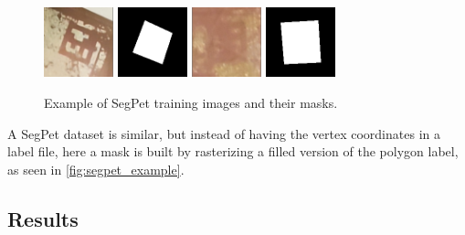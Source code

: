 \documentclass[10pt]{book}
\newcommand{\figureref}[1]{\autoref{#1}}
\begin{document}

\begin{figure}
  \centering
     {\includegraphics[width=0.18\textwidth]{image/segpet_example_in}}
     {\includegraphics[width=0.18\textwidth]{image/segpet_example_seg}}
     {\includegraphics[width=0.18\textwidth]{image/segpet_example_2_in}}
     {\includegraphics[width=0.18\textwidth]{image/segpet_example_2_seg}}
  \caption{Example of SegPet training images and their masks.}
  \label{fig:segpet_example}
\end{figure}

A SegPet dataset is similar, but instead of having the vertex coordinates in a label file, here a mask is built by rasterizing a filled version of the polygon label, as seen in \figureref{fig:segpet_example}.

\subsection{Results}
\end{document}
